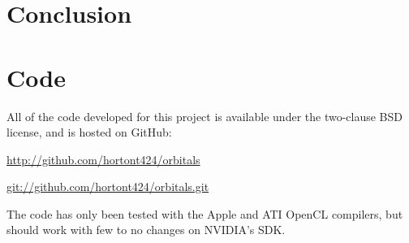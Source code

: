 \documentclass{acmsiggraph}
\begin{document}
\section{Conclusion}

\section{Code}

All of the code developed for this project is available under the two-clause BSD license, and is hosted on GitHub:

\url{http://github.com/hortont424/orbitals}

\url{git://github.com/hortont424/orbitals.git}

The code has only been tested with the Apple and ATI OpenCL compilers, but should work with few to no changes on NVIDIA's SDK.


\nocite{*}

\end{document}
